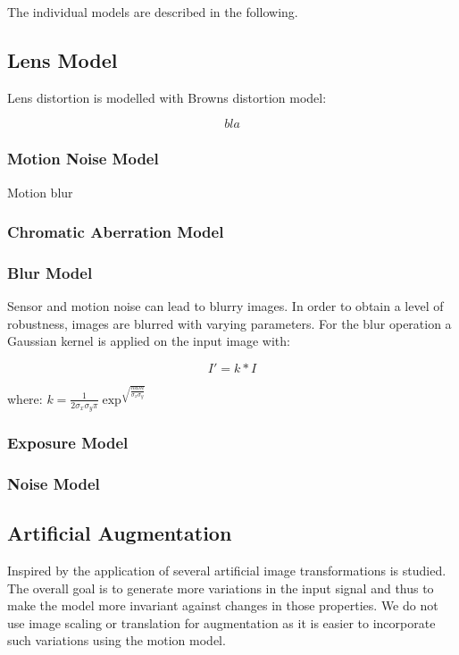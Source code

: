 The individual models are described in the following.

\subsection{Lens Model}

\cite{Vass}
Lens distortion is modelled with Browns distortion model:

\begin{equation}
bla
\label{eq:distortion}
\end{equation}


\subsubsection{Motion Noise Model}

Motion blur

\subsubsection{Chromatic Aberration Model}


\subsubsection{Blur Model}

Sensor and motion noise can lead to blurry images. In order to obtain a level of robustness, images are blurred with varying parameters. For the blur operation a Gaussian kernel is applied on the input image with:

$$ I' = k * I $$

where: $k = \frac{1}{2\sigma_x\sigma_y\pi}\exp^{\sqrt{\frac{num}{\sigma_x\sigma_y}}} $

\subsubsection{Exposure Model}


\subsubsection{Noise Model}


\subsection{Artificial Augmentation}

Inspired by \cite{Howard2013, Redmon, Liu} the application of several artificial image transformations is studied. The overall goal is to generate more variations in the input signal and thus to make the model more invariant against changes in those properties. We do not use image scaling or translation for augmentation as it is easier to incorporate such variations using the motion model.


